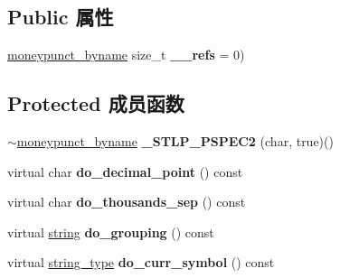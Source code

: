 \subsection*{Public 属性}
\begin{DoxyCompactItemize}
\item 
\mbox{\label{classmoneypunct__byname_3_01char_00_01true_01_4_ad5c1f4c4dd8be5c50700cca456fc6c55}} 
\hyperlink{classmoneypunct__byname}{moneypunct\+\_\+byname} size\+\_\+t {\bfseries \+\_\+\+\_\+refs} = 0)
\end{DoxyCompactItemize}
\subsection*{Protected 成员函数}
\begin{DoxyCompactItemize}
\item 
\mbox{\label{classmoneypunct__byname_3_01char_00_01true_01_4_a83e7f467522482ac0236547e1b1fbd5d}} 
$\sim$\hyperlink{classmoneypunct__byname}{moneypunct\+\_\+byname} {\bfseries \+\_\+\+S\+T\+L\+P\+\_\+\+P\+S\+P\+E\+C2} (char, true)()
\item 
\mbox{\label{classmoneypunct__byname_3_01char_00_01true_01_4_af79977ca1f7e98d59a3f07c370cb1b7b}} 
virtual char {\bfseries do\+\_\+decimal\+\_\+point} () const
\item 
\mbox{\label{classmoneypunct__byname_3_01char_00_01true_01_4_a9b0f21d44fa3820b8847d9925894ea05}} 
virtual char {\bfseries do\+\_\+thousands\+\_\+sep} () const
\item 
\mbox{\label{classmoneypunct__byname_3_01char_00_01true_01_4_ae7bb0e78f28b68904e4876da1389322e}} 
virtual \hyperlink{structstring}{string} {\bfseries do\+\_\+grouping} () const
\item 
\mbox{\label{classmoneypunct__byname_3_01char_00_01true_01_4_aed741d0805055b707dee614332a0e5d6}} 
virtual \hyperlink{structstring}{string\+\_\+type} {\bfseries do\+\_\+curr\+\_\+symbol} () const
\item 

\end{DoxyCompactItemize}
